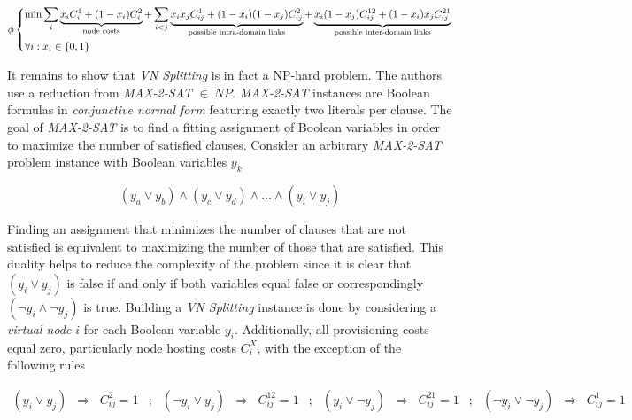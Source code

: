 \documentclass[prodmode,acmtomccap]{acmlarge}
\begin{document}
\normalsize

\[
 \phi
   \begin{dcases}
		\min \sum\limits_{i} \underbrace{x_i C_i^1 + (1-x_i) C_i^2 }_{\text{node costs}}
			+ \sum\limits_{i < j} \underbrace{x_i x_j C_{ij}^{1} + (1 - x_i)(1 - x_j) C_{ij}^{2}}_{\text{possible intra-domain links}}
			+ \underbrace{x_i (1 - x_j) C_{ij}^{12} + (1 - x_i)x_j C_{ij}^{21}}_{\text{possible inter-domain links}} \\
		\forall i : x_i \in \{ 0,1\}
   \end{dcases}
\]

\small

It remains to show that \emph{VN Splitting} is in fact a NP-hard problem. The authors use a reduction from \emph{MAX-2-SAT} $\in~NP$. \mbox{\emph{MAX-2-SAT}} instances
are Boolean formulas in \emph{conjunctive normal form}
featuring exactly two literals per clause. The goal of \mbox{\emph{MAX-2-SAT}} is to find a fitting assignment of Boolean variables in order to maximize the number of satisfied clauses. Consider an arbitrary 
\mbox{\emph{MAX-2-SAT}} problem instance with Boolean variables $y_k$

\normalsize

$$
(y_a \vee y_b) \wedge (y_c \vee y_d) \wedge \dots \wedge (y_i \vee y_j)
$$

\small

Finding an assignment that minimizes the number of clauses that are not satisfied is equivalent to maximizing the number of those that are satisfied. This duality helps to reduce the complexity of the problem
since it is clear that $(y_i \vee y_j)$ is false if and only if both variables equal false or correspondingly $(\lnot y_i \wedge \lnot y_j)$ is true.
Building a \emph{VN Splitting} instance is done by considering a \emph{virtual node} $i$ for each Boolean variable $y_i$. Additionally, all provisioning costs equal zero, particularly node hosting costs $C_i^{X}$,
with the exception of the following rules

\normalsize

$$
\begin{array}{cccccccccccccccc}
	(y_i \vee y_j) & \Rightarrow & C_{ij}^2 = 1 &;& (\lnot y_i \vee y_j) & \Rightarrow &C_{ij}^{12} = 1 &;& (y_i \vee \lnot y_j) & \Rightarrow & C_{ij}^{21} = 1 &;& (\lnot y_i \vee \lnot y_j) & \Rightarrow & C_{ij}^1 = 1
	
\end{array}
$$

\small
\end{document}
